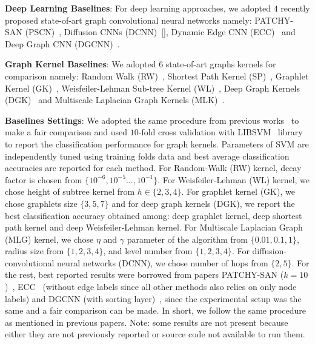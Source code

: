 \documentclass{article}
\begin{document}
\noindent \textbf{Deep Learning Baselines}: For deep learning approaches, we adopted $4$ recently proposed state-of-art graph convolutional neural networks namely: PATCHY-SAN (PSCN)~\cite{niepert2016learning}, Diffusion CNNs (DCNN)~[\cite{atwood2016diffusion}], Dynamic Edge CNN (ECC)~\cite{simonovsky2017dynamic}  and Deep Graph CNN (DGCNN)~\cite{zhang2018end}.  

\noindent \textbf{Graph Kernel Baselines}: We adopted $6$ state-of-art  graphs kernels for comparison namely: Random Walk (RW)~\cite{gartner2003graph}, Shortest Path Kernel (SP)~\cite{borgwardt2005shortest}, Graphlet Kernel (GK)~\cite{shervashidze2009efficient}, Weisfeiler-Lehman Sub-tree Kernel (WL)~\cite{shervashidze2011weisfeiler}, Deep Graph Kernels (DGK)~\cite{yanardag2015deep} and  Multiscale Laplacian Graph Kernels (MLK)~\cite{kondor2016multiscale}. 
 

\noindent \textbf{Baselines Settings}: We adopted the same procedure from previous works~\cite{niepert2016learning,yanardag2015deep,zhang2018end} to make a fair comparison and used $10$-fold cross validation with  
LIBSVM~\cite{chang2011libsvm} library to report the classification performance for graph kernels. Parameters of SVM are independently tuned using  training folds data and   best average classification accuracies are reported   for each    method. For Random-Walk (RW) kernel, decay factor is chosen from $\{10^{-6},10^{-5}...,10^{-1}\}$. For Weisfeiler-Lehman (WL) kernel, we chose height of subtree kernel from $h\in\{2,3,4\}$.  For graphlet kernel (GK), we chose graphlets size $\{3,5,7\}$ and for deep graph kernels (DGK), we report the best classification accuracy obtained among: deep graphlet kernel, deep shortest path kernel and deep Weisfeiler-Lehman kernel. For Multiscale Laplacian Graph (MLG) kernel, we chose $\eta$ and $\gamma$ parameter of the algorithm from $\{0.01,0.1,1\}$, radius size from $\{1,2,3,4\}$, and level number from $\{1,2,3,4\}$. For  diffusion-convolutional neural networks (DCNN), we chose number of hops from $\{2,5\}$. For the rest, best reported results were borrowed from papers PATCHY-SAN  ($k=10$)~\cite{niepert2016learning}, ECC~\cite{simonovsky2017dynamic} (without edge labels since all other methods also relies on only node labels) and DGCNN (with sorting layer)~\cite{zhang2018end}, since the experimental setup was the same and a fair comparison can be made. In short, we follow    the same procedure as mentioned in previous papers. Note: some results  are not present because either they are not previously reported  or source code not available to run them. 
\end{document}
